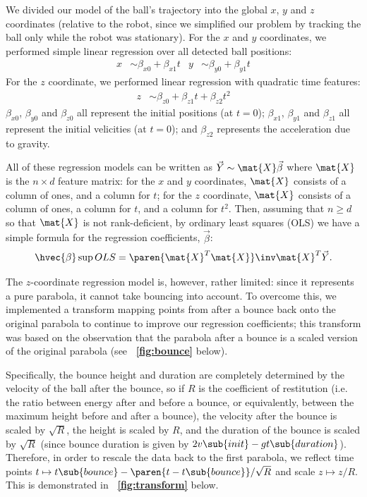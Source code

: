 \documentclass[letterpaper, 11pt]{article}
\newcommand*{\figref}[1]{\textbf{\figurename~\ref{#1}}}
\renewcommand{\v}[1]{\vec{#1}}
\begin{document}
\begin{enumerate}[label=\textbf{\arabic*.}]
We divided our model of the ball's trajectory into the global $x$, $y$ and $z$ coordinates (relative to the robot, since we simplified our problem by tracking the ball only while the robot was stationary). For the $x$ and $y$ coordinates, we performed simple linear regression over all detected ball positions:
\begin{align*}
    x &\sim \beta_{x0} + \beta_{x1}t & y &\sim \beta_{y0} + \beta_{y1}t
\end{align*}
For the $z$ coordinate, we performed linear regression with quadratic time features:
\begin{align*}
    z &\sim \beta_{z0} + \beta_{z1}t + \beta_{z2}t^2
\end{align*}
$\beta_{x0}$, $\beta_{y0}$ and $\beta_{z0}$ all represent the initial positions (at $t=0$); $\beta_{x1}$, $\beta_{y1}$ and $\beta_{z1}$ all represent the initial velicities (at $t=0$); and $\beta_{z2}$ represents the acceleration due to gravity.

All of these regression models can be written as $\v{Y} \sim \mat{X} \v{\beta}$ where $\mat{X}$ is the $n\times d$ feature matrix: for the $x$ and $y$ coordinates, $\mat{X}$ consists of a column of ones, and a column for $t$; for the $z$ coordinate, $\mat{X}$ consists of a column of ones, a column for $t$, and a column for $t^2$. Then, assuming that $n\ge d$ so that $\mat{X}$ is not rank-deficient, by ordinary least squares (OLS) we have a simple formula for the regression coefficients, $\v{\beta}$:
\[ \hvec{\beta}\sup{OLS} = \paren{ \mat{X}^T\mat{X} }\inv \mat{X}^T \v{Y}. \]

The $z$-coordinate regression model is, however, rather limited: since it represents a pure parabola, it cannot take bouncing into account. To overcome this, we implemented a transform mapping points from after a bounce back onto the original parabola to continue to improve our regression coefficients; this transform was based on the observation that the parabola after a bounce is a scaled version of the original parabola (see \figref{fig:bounce} below).

Specifically, the bounce height and duration are completely determined by the velocity of the ball after the bounce, so if $R$ is the coefficient of restitution (i.e. the ratio between energy after and before a bounce, or equivalently, between the maximum height before and after a bounce), the velocity after the bounce is scaled by $\sqrt{R}$, the height is scaled by $R$, and the duration of the bounce is scaled by $\sqrt{R}$ (since bounce duration is given by $2v\sub{init} - gt\sub{duration}$). Therefore, in order to rescale the data back to the first parabola, we reflect time points $t \mapsto t\sub{bounce} - \paren{t - t\sub{bounce}} / \sqrt{R}$ and scale $z \mapsto z / R$. This is demonstrated in \figref{fig:transform} below.


\end{enumerate}
\end{document}
